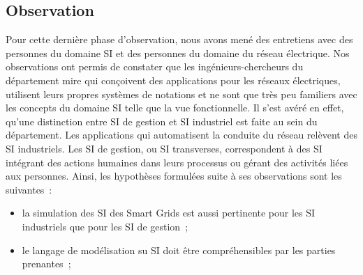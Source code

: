 			\subsection{Observation}
		Pour cette dernière phase d'observation, nous avons mené des entretiens avec des personnes du domaine SI et des personnes du domaine du réseau électrique. Nos observations ont permis de constater que les ingénieurs-chercheurs du département \gls{mire} qui conçoivent des applications pour les réseaux électriques, utilisent leurs propres systèmes de notations et ne sont que très peu familiers avec les concepts du domaine SI telle que la vue fonctionnelle. Il s'est avéré en effet, qu'une distinction entre SI de gestion et SI industriel est faite au sein du département. Les applications qui automatisent la conduite du réseau relèvent des SI industriels. Les SI de gestion, ou SI transverses, correspondent à des SI intégrant des actions humaines dans leurs processus ou gérant des activités liées aux personnes.
		Ainsi, les hypothèses formulées suite à ses observations sont les suivantes~:
		\begin{itemize}
			\item la simulation des SI des Smart Grids est aussi pertinente pour les SI industriels que pour les SI de gestion~;
			\item le langage de modélisation su SI doit être compréhensibles par les parties prenantes~;
		\end{itemize}	 
